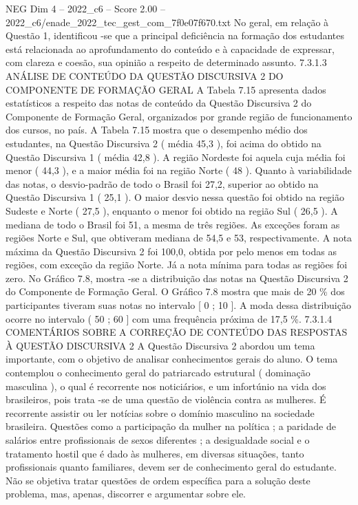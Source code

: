 \begin{textsample}{NEG Dim 4 – 2022\_c6 – Score 2.00 – 2022\_c6/enade\_2022\_tec\_gest\_com\_7f0e07f670.txt}
No geral, em relação à Questão 1, identificou -se que a principal deficiência na formação dos estudantes está relacionada ao aprofundamento do conteúdo e à capacidade de expressar, com clareza e coesão, sua opinião a respeito de determinado assunto. 7.3.1.3 ANÁLISE DE CONTEÚDO DA QUESTÃO DISCURSIVA 2 DO COMPONENTE DE FORMAÇÃO GERAL A Tabela 7.15 apresenta dados estatísticos a respeito das notas de conteúdo da Questão Discursiva 2 do Componente de Formação Geral, organizados por grande região de funcionamento dos cursos, no país.
A Tabela 7.15 mostra que o desempenho médio dos estudantes, na Questão Discursiva 2 ( média 45,3 ), foi acima do obtido na Questão Discursiva 1 ( média 42,8 ).
A região Nordeste foi aquela cuja média foi menor ( 44,3 ), e a maior média foi na região Norte ( 48 ).
Quanto à variabilidade das notas, o desvio-padrão de todo o Brasil foi 27,2, superior ao obtido na Questão Discursiva 1 ( 25,1 ).
O maior desvio nessa questão foi obtido na região Sudeste e Norte ( 27,5 ), enquanto o menor foi obtido na região Sul ( 26,5 ).
A mediana de todo o Brasil foi 51, a mesma de três regiões.
As exceções foram as regiões Norte e Sul, que obtiveram mediana de 54,5 e 53, respectivamente.
A nota máxima da Questão Discursiva 2 foi 100,0, obtida por pelo menos em todas as regiões, com exceção da região Norte.
Já a nota mínima para todas as regiões foi zero.
No Gráfico 7.8, mostra -se a distribuição das notas na Questão Discursiva 2 do Componente de Formação Geral.
O Gráfico 7.8 mostra que mais de 20 \% dos participantes tiveram suas notas no intervalo [ 0 ; 10 ].
A moda dessa distribuição ocorre no intervalo ( 50 ; 60 ] com uma frequência próxima de 17,5 \%. 7.3.1.4 COMENTÁRIOS SOBRE A CORREÇÃO DE CONTEÚDO DAS RESPOSTAS À QUESTÃO DISCURSIVA 2 A Questão Discursiva 2 abordou um tema importante, com o objetivo de analisar conhecimentos gerais do aluno.
O tema contemplou o conhecimento geral do patriarcado estrutural ( dominação masculina ), o qual é recorrente nos noticiários, e um infortúnio na vida dos brasileiros, pois trata -se de uma questão de violência contra as mulheres.
É recorrente assistir ou ler notícias sobre o domínio masculino na sociedade brasileira.
Questões como a participação da mulher na política ; a paridade de salários entre profissionais de sexos diferentes ; a desigualdade social e o tratamento hostil que é dado às mulheres, em diversas situações, tanto profissionais quanto familiares, devem ser de conhecimento geral do estudante.
Não se objetiva tratar questões de ordem específica para a solução deste problema, mas, apenas, discorrer e argumentar sobre ele.

\end{textsample}
